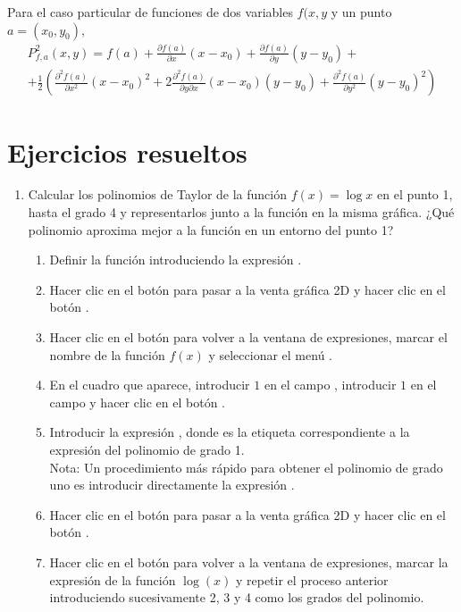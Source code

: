 Para el caso particular de funciones de dos variables $f(x,y$ y un punto $a=(x_0,y_0)$, 
\begin{multline*}
P^2_{f,a}(x,y) = f(a)+\frac{\partial f(a)}{\partial x}(x-x_0)+\frac{\partial f(a)}{\partial y}(y-y_0)+\\
+\frac{1}{2}\left(\frac{\partial^2 f(a)}{\partial x^2}(x-x_0)^2 + 2\frac{\partial^2 f(a)}{\partial y\partial x}
(x-x_0)(y-y_0) + \frac{\partial^2 f(a)}{\partial y^2}(y-y_0)^2\right)
\end{multline*}


\newpage

\section{Ejercicios resueltos}

\begin{enumerate}[leftmargin=*]
\item Calcular los polinomios de Taylor de la función $f(x)=\log x$ en el punto 1, hasta el grado 4 y representarlos junto a la función en
la misma gráfica.
¿Qué polinomio aproxima mejor a la función en un entorno del punto 1?

\begin{indication}
\begin{enumerate}
\item Definir la función introduciendo la expresión . 
\item Hacer clic en el botón  para pasar a la venta gráfica 2D y hacer clic en el botón
.
\item Hacer clic en el botón   para volver a la ventana de expresiones,
marcar el nombre de la función $f(x)$ y seleccionar el menú .
\item En el cuadro que aparece, introducir $1$ en el campo , introducir $1$ en el campo  y
hacer clic en el botón .
\item Introducir la expresión , donde  es la etiqueta correspondiente a la expresión
del polinomio de grado 1.\\
Nota: Un procedimiento más rápido para obtener el polinomio de grado uno es introducir directamente la expresión
.
\item Hacer clic en el botón  para pasar a la venta gráfica 2D y hacer clic en el botón
.
\item Hacer clic en el botón  para volver a la ventana de expresiones, marcar la
expresión de la función $\log(x)$ y repetir el proceso anterior introduciendo sucesivamente 2, 3 y 4 como los grados del polinomio.
\end{enumerate}
\end{indication}


\end{enumerate}
